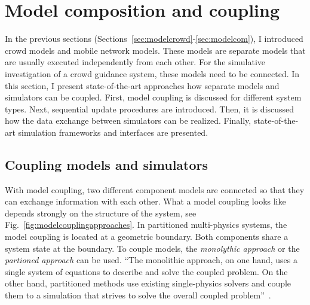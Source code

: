 
\FloatBarrier


\section{Model composition and coupling}
\label{sec:simulationframeworks}

In the previous sections (Sections~\ref{sec:modelcrowd}-\ref{sec:modelcom}), I introduced crowd models and mobile network models. These models are separate models that are usually executed independently from each other. For the simulative investigation of a crowd guidance system, these models need to be connected. In this section, I present state-of-the-art approaches how separate models and simulators can be coupled. First, model coupling is discussed for different system types. Next, sequential update procedures are introduced. Then, it is discussed how the data exchange between simulators can be realized. Finally, state-of-the-art simulation frameworks and interfaces are presented.

\subsection{Coupling models and simulators}
With model coupling, two different component models are connected so that they can exchange information with each other.  What a model coupling looks like depends strongly on the structure of the system, see Fig.~\ref{fig:modelcouplingapproaches}. In partitioned multi-physics systems, the model coupling is located at a geometric boundary. Both components share a system state at the boundary. To couple models, the \textit{monolythic approach} or the \textit{partioned approach} can be used. 
\enquote{The monolithic approach, on one hand, uses a single system of equations to describe and solve the coupled problem. On the other hand, partitioned methods use existing single-physics solvers and couple them to a simulation that strives to solve the overall coupled problem}~\cite[p.16]{lindner-2019-cs}.  


